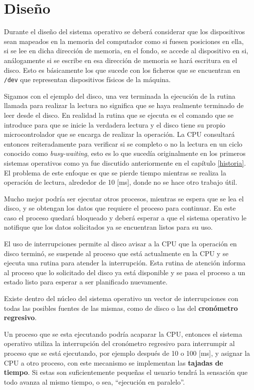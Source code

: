 \section{Diseño}
Durante el diseño del sistema operativo se deberá considerar que los
dispositivos sean mapeados en la memoria del computador como si fuesen
posiciones en ella, si se lee en dicha dirección de memoria, en el fondo, se
accede al dispositivo en si, análogamente si se escribe en esa dirección de
memoria se hará escritura en el disco. Esto es básicamente los que sucede con
los ficheros que se encuentran en \texttt{/dev} que representan dispositivos
físicos de la máquina.

Sigamos con el ejemplo del disco, una vez terminada la ejecución de la rutina
llamada para realizar la lectura no significa que se haya realmente terminado de
leer desde el disco. En realidad la rutina que se ejecuta es el comando que se
introduce para que se inicie la verdadera lectura y el disco tiene su propio
microcontrolador que se encarga de realizar la operación. La CPU consultará
entonces reiteradamente para verificar si se completo o no la lectura en un
ciclo conocido como \textit{busy-waiting}, esto es lo que sucedía originalmente
en los primeros sistemas operativos como ya fue discutido anteriormente en el
capítulo \ref{historia}. El problema de este enfoque es que se pierde tiempo
mientras se realiza la operación de lectura, alrededor de 10 [ms], donde no se
hace otro trabajo útil.

Mucho mejor podría ser ejecutar otros procesos, mientras se espera que se lea el
disco, y se obtengan los datos que requiere el proceso para continuar. En este
caso el proceso quedará bloqueado y deberá esperar a que el sistema operativo le
notifique que los datos solicitados ya se encuentran listos para su uso.

El uso de interrupciones permite al disco avisar a la CPU que la operación en
disco terminó, se suspende al proceso que está actualmente en la CPU y se
ejecuta una rutina para atender la interrupción. Esta rutina de atención informa
al proceso que lo solicitado del disco ya está disponible y se pasa el proceso a
un estado listo para esperar a ser planificado nuevamente.

Existe dentro del núcleo del sistema operativo un vector de interrupciones con
todas las posibles fuentes de las mismas, como de disco o las del
\textbf{cronómetro regresivo}.

Un proceso que se esta ejecutando podría acaparar la CPU, entonces el sistema
operativo utiliza la interrupción del cronómetro regresivo para interrumpir al
proceso que se está ejecutando, por ejemplo después de 10 o 100 [ms], y asignar
la CPU a otro proceso, con este mecanismo se implementan las \textbf{tajadas de
tiempo}. Si estas son suficientemente pequeñas el usuario tendrá la sensación
que todo avanza al mismo tiempo, o sea, ``ejecución en paralelo''.

